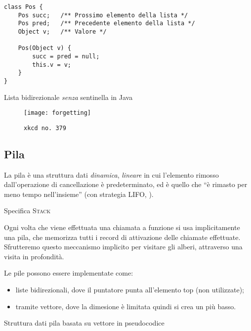 \begin{verbatim}
class Pos {
	Pos succ;	/** Prossimo elemento della lista */
	Pos pred;	/** Precedente elemento della lista */
	Object v;	/** Valore */

	Pos(Object v) {
		succ = pred = null;
		this.v = v;
	}
}
\end{verbatim}

\begin{listing}[!p]
	\caption{Lista bidirezionale \emph{senza} sentinella in Java}%
	\label{lst:java-lista-bidirezionale-sentinella}%
\end{listing}

\begin{figure}[H]
	\centering
	\texttt{[image: forgetting]}
	\caption[]{\texttt{xkcd no.\ 379}}
	\label{fig:forgetting}
\end{figure}

\subsection{Pila}

La pila è una struttura dati \emph{dinamica}, \emph{lineare} in cui l'elemento rimosso dall'operazione di cancellazione è predeterminato, ed è quello che \enquote{è rimasto per meno tempo nell'insieme} (con strategia \textsc{LIFO}, ).

\begin{algorithm}[H]
	\caption[Specifica pila]{Specifica \textsc{Stack}}
	
\end{algorithm}

Ogni volta che viene effettuata una chiamata a funzione si usa implicitamente una pila, che memorizza tutti i record di attivazione delle chiamate effettuate.
Sfrutteremo questo meccanismo implicito per visitare gli alberi, attraverso una visita in profondità.

Le pile possono essere implementate come:
\begin{itemize}
	\item liste bidirezionali, dove il puntatore punta all'elemento \textsf{top} (non utilizzate);
	\item tramite vettore, dove la dimesione è limitata quindi si crea un  più basso.
\end{itemize}

\begin{algorithm}[H]
	\caption{Struttura dati pila basata su vettore in pseudocodice}
	
\end{algorithm}

